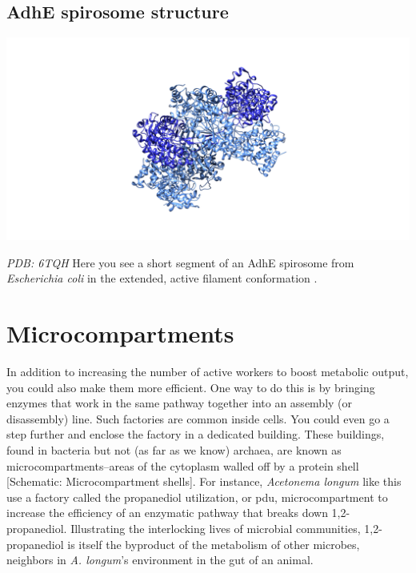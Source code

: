 \documentclass[]{tufte-book}
\begin{document}
\hypertarget{AdhE_spirosome_structure}{%
\subsection{AdhE spirosome structure}\label{AdhE_spirosome_structure}}

\includegraphics{img/schematics/4_5_1}

\emph{PDB: 6TQH}
Here you see a short segment of an AdhE spirosome from \emph{Escherichia coli} in the extended, active filament conformation \citep{pony2020}.

\hypertarget{microcompartments}{%
\section{Microcompartments}\label{microcompartments}}

In addition to increasing the number of active workers to boost metabolic output, you could also make them more efficient. One way to do this is by bringing enzymes that work in the same pathway together into an assembly (or disassembly) line. Such factories are common inside cells. You could even go a step further and enclose the factory in a dedicated building. These buildings, found in bacteria but not (as far as we know) archaea, are known as microcompartments--areas of the cytoplasm walled off by a protein shell {[}Schematic: Microcompartment shells{]}. For instance, \emph{Acetonema longum} like this use a factory called the propanediol utilization, or pdu, microcompartment to increase the efficiency of an enzymatic pathway that breaks down 1,2-propanediol. Illustrating the interlocking lives of microbial communities, 1,2-propanediol is itself the byproduct of the metabolism of other microbes, neighbors in \emph{A. longum}'s environment in the gut of an animal.



\hypertarget{htmlwidget-e95e0ecd8b537c15aeb7}{}
\end{document}
